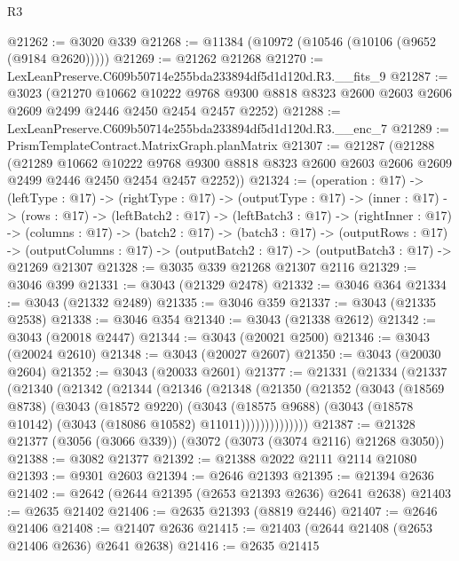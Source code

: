 \begin{lexlean}{R3}
\begin{coremodule}
@21262 := @3020 @339
@21268 := @11384 (@10972 (@10546 (@10106 (@9652 (@9184 @2620)))))
@21269 := @21262 @21268
@21270 := LexLeanPreserve.C609b50714e255bda233894df5d1d120d.R3.__fits_9
@21287 := @3023
    (@21270
      @10662
      @10222
      @9768
      @9300
      @8818
      @8323
      @2600
      @2603
      @2606
      @2609
      @2499
      @2446
      @2450
      @2454
      @2457
      @2252)
@21288 := LexLeanPreserve.C609b50714e255bda233894df5d1d120d.R3.__enc_7
@21289 := PrismTemplateContract.MatrixGraph.planMatrix
@21307 := @21287
    (@21288
      (@21289
        @10662
        @10222
        @9768
        @9300
        @8818
        @8323
        @2600
        @2603
        @2606
        @2609
        @2499
        @2446
        @2450
        @2454
        @2457
        @2252))
@21324 := (operation : @17) ->
  (leftType : @17) ->
  (rightType : @17) ->
  (outputType : @17) ->
  (inner : @17) ->
  (rows : @17) ->
  (leftBatch2 : @17) ->
  (leftBatch3 : @17) ->
  (rightInner : @17) ->
  (columns : @17) ->
  (batch2 : @17) ->
  (batch3 : @17) ->
  (outputRows : @17) ->
  (outputColumns : @17) -> (outputBatch2 : @17) -> (outputBatch3 : @17) -> @21269 @21307
@21328 := @3035 @339 @21268 @21307 @2116
@21329 := @3046 @399
@21331 := @3043 (@21329 @2478)
@21332 := @3046 @364
@21334 := @3043 (@21332 @2489)
@21335 := @3046 @359
@21337 := @3043 (@21335 @2538)
@21338 := @3046 @354
@21340 := @3043 (@21338 @2612)
@21342 := @3043 (@20018 @2447)
@21344 := @3043 (@20021 @2500)
@21346 := @3043 (@20024 @2610)
@21348 := @3043 (@20027 @2607)
@21350 := @3043 (@20030 @2604)
@21352 := @3043 (@20033 @2601)
@21377 := @21331
    (@21334
      (@21337
        (@21340
          (@21342
            (@21344
              (@21346
                (@21348
                  (@21350
                    (@21352
                      (@3043
                        (@18569 @8738)
                        (@3043
                          (@18572 @9220)
                          (@3043
                            (@18575 @9688)
                            (@3043 (@18578 @10142) (@3043 (@18086 @10582) @11011))))))))))))))
@21387 := @21328 @21377 (@3056 (@3066 @339)) (@3072 (@3073 (@3074 @2116) @21268 @3050))
@21388 := @3082 @21377
@21392 := @21388 @2022 @2111 @2114 @21080
@21393 := @9301 @2603
@21394 := @2646 @21393
@21395 := @21394 @2636
@21402 := @2642 (@2644 @21395 (@2653 @21393 @2636) @2641 @2638)
@21403 := @2635 @21402
@21406 := @2635 @21393 (@8819 @2446)
@21407 := @2646 @21406
@21408 := @21407 @2636
@21415 := @21403 (@2644 @21408 (@2653 @21406 @2636) @2641 @2638)
@21416 := @2635 @21415

\end{coremodule}
\end{lexlean}
